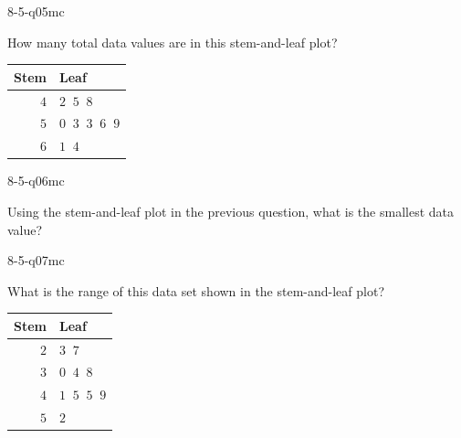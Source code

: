 \begin{practiceQuestion}{8-5-q05}{mc}
\begin{questionText}
How many total data values are in this stem-and-leaf plot?

\begin{center}
\begin{tabular}{r|l}
\textbf{Stem} & \textbf{Leaf} \\
\hline
$4$ & $2\;\;5\;\;8$ \\
$5$ & $0\;\;3\;\;3\;\;6\;\;9$ \\
$6$ & $1\;\;4$
\end{tabular}
\end{center}
\end{questionText}
\end{practiceQuestion}

\begin{practiceQuestion}{8-5-q06}{mc}
\begin{questionText}
Using the stem-and-leaf plot in the previous question, what is the smallest data value?
\end{questionText}
\end{practiceQuestion}

\begin{practiceQuestion}{8-5-q07}{mc}
\begin{questionText}
What is the range of this data set shown in the stem-and-leaf plot?

\begin{center}
\begin{tabular}{r|l}
\textbf{Stem} & \textbf{Leaf} \\
\hline
$2$ & $3\;\;7$ \\
$3$ & $0\;\;4\;\;8$ \\
$4$ & $1\;\;5\;\;5\;\;9$ \\
$5$ & $2$
\end{tabular}
\end{center}
\end{questionText}
\end{practiceQuestion}

